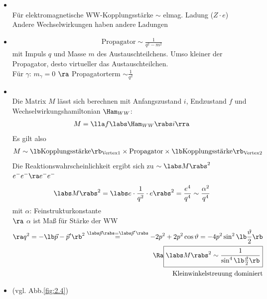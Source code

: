 \begin{itemize}
\item {}\\
Für elektromagnetische WW-Kopplungsstärke $\sim$ elmag. Ladung ($Z\cdot e$)\\
Andere Wechselwirkungen haben andere Ladungen
\item {}
\begin{align}
\boxed{\text{Propagator} \sim \frac{1}{q^2-m^2}}
\end{align}
mit Impuls $q$ und Masse $m$ des Austauschteilchens. Umso kleiner der Propagator, desto \glqq virtueller\grqq{} das Austauschteilchen.\\
Für $\gamma: \, m_\gamma =0$ $\ra$ Propagatorterm $\sim \frac{1}{q^2}$
\item {}\\
Die Matrix $M$ lässt sich berechnen mit Anfangszustand $i$, Endzustand $f$ und Wechselwirkungshamiltonian $\Ham_{WW}$:
\begin{align}
M = \lla f\labs  \Ham_{WW} \rabs  i \rra
\end{align}
Es gilt also
\begin{align*}
M \sim \lb  \text{Kopplungsstärke}\rb _\text{Vertex1} \times \text{Propagator} \times \lb  \text{Kopplungsstärke}\rb _\text{Vertex2}
\end{align*}
Die Reaktionswahrscheinlichkeit ergibt sich zu $\sim \labs M\rabs^2$\\
 $e^-e^- \ra e^-e^-$
\begin{align}
\labs M \rabs^2 = \labs e \cdot \frac{1}{q^2} \cdot e \rabs^2 = \frac{e^4}{q^4} \sim \frac{\alpha^2}{q^4}
\end{align}
mit $\alpha$: Feinstrukturkonstante\\
$\ra$ $\alpha$ ist Maß für Stärke der WW
\begin{align}
\begin{split}
\ra q^2 = - \lb  \vec{p} - \vec{p}^\prime \rb ^2 \overset{\labs\vec{p}\rabs = \labs \vec{p}^\prime\rabs}{=} -2p^2 +2p^2\cos \vartheta = -4 p^2 \sin^2 \lb \frac{\vartheta}{2}\rb \\
\Ra \boxed{\labs M \rabs^2 \sim \frac{1}{\sin^4 \lb \frac{\vartheta}{2}\rb }}\\
\text{ Kleinwinkelstreuung dominiert}
\end{split}
\end{align}
\item {} (vgl. Abb.\ref{fig:2.4})\\

\end{itemize}
